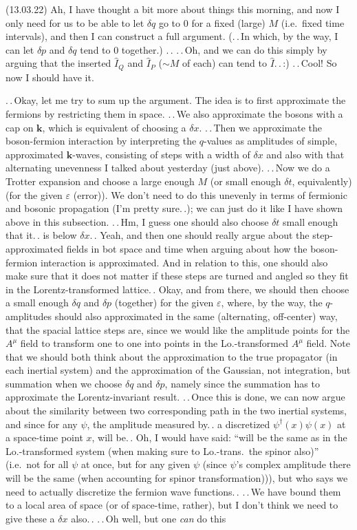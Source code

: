 \documentclass{report}
\begin{document}
(13.03.22) Ah, I have thought a bit more about things this morning, and now I only need for us to be able to let $\delta q$ go to 0 for a fixed (large) $M$ (i.e.\ fixed time intervals), and then I can construct a full argument. (.\,.\,In which, by the way, I can let $\delta p$ and $\delta q$ tend to 0 together.) .\,. .\,.\,Oh, and we can do this simply by arguing that the inserted $\hat I_Q$ and $\hat I_P$ ($\sim M$ of each) can tend to $\hat I$.\,.\,:) .\,.\,Cool! So now I should have it. 

.\,.\,Okay, let me try to sum up the argument. The idea is to first approximate the fermions by restricting them in space. .\,.\,We also approximate the bosons with a cap on $\boldsymbol{k}$, which is equivalent of choosing a $\delta x$. .\,.\,Then we approximate the boson-fermion interaction by interpreting the $q$-values as amplitudes of simple, approximated $\boldsymbol{k}$-waves, consisting of steps with a width of $\delta x$ and also with that alternating unevenness I talked about yesterday (just above). .\,.\,Now we do a Trotter expansion and choose a large enough $M$ (or small enough $\delta t$, equivalently) (for the given $\varepsilon$ (error)). We don't need to do this unevenly in terms of fermionic and bosonic propagation (I'm pretty sure.\,.); we can just do it like I have shown above in this subsection. .\,.\,Hm, I guess one should also choose $\delta t$ small enough that it.\,. is below $\delta x$.\,. Yeah, and then one should really argue about the step-approximated fields in bot space and time when arguing about how the boson-fermion interaction is approximated. And in relation to this, one should also make sure that it does not matter if these steps are turned and angled so they fit in the Lorentz-transformed lattice.\,. Okay, and from there, we should then choose a small enough $\delta q$ and $\delta p$ (together) for the given $\varepsilon$, where, by the way, the $q$-amplitudes should also approximated in the same (alternating, off-center) way, that the spacial lattice steps are, since we would like the amplitude points for the $A^\mu$ field to transform one to one into points in the Lo.-transformed $A^\mu$ field. Note that we should both think about the approximation to the true propagator (in each inertial system) and the approximation of the Gaussian, not integration, but summation when we choose $\delta q$ and $\delta p$, namely since the summation has to approximate the Lorentz-invariant result. .\,.\,Once this is done, we can now argue about the similarity between two corresponding path in the two inertial systems, and since for any $\psi$, the amplitude measured by.\,. a discretized $\psi^\dagger(x)\psi(x)$ at a space-time point $x$, will be.\,. Oh, I would have said: ``will be the same as in the Lo.-transformed system (when making sure to Lo.-trans.\ the spinor also)'' (i.e.\ not for all $\psi$ at once, but for any given $\psi$ (since $\psi$'s complex amplitude there will be the same (when accounting for spinor transformation))), but who says we need to actually discretize the fermion wave functions.\,. .\,.\,We have bound them to a local area of space (or of space-time, rather), but I don't think we need to give these a $\delta x$ also.\,. .\,.\,Oh well, but one \emph{can} do this 
\end{document}
